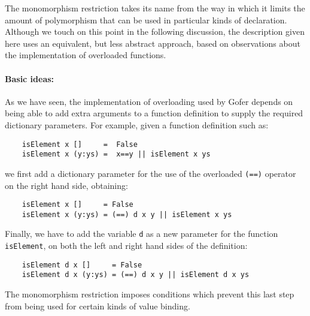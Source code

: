The monomorphism restriction takes its name from the way  in  which  it
limits the amount of polymorphism that can be used in particular  kinds
of declaration.  Although we touch  on  this  point  in  the  following
discussion, the description given here uses  an  equivalent,  but  less
abstract approach, based on observations about  the  implementation  of
overloaded functions.

\paragraph{Basic ideas:}
As we have seen,  the  implementation  of  overloading  used  by  Gofer
depends on being able to add extra arguments to a  function  definition
to supply the required dictionary parameters.   For  example,  given  a
function definition such as:
\begin{verbatim}
    isElement x []     =  False
    isElement x (y:ys) =  x==y || isElement x ys
\end{verbatim}
we first add a dictionary parameter for the use of the overloaded  \verb"(==)"
operator on the right hand side, obtaining:
\begin{verbatim}
    isElement x []     = False
    isElement x (y:ys) = (==) d x y || isElement x ys
\end{verbatim}
Finally, we have to add the variable \verb"d"  as  a  new  parameter  for  the
function \verb"isElement", on both the  left  and  right  hand  sides  of  the
definition:
\begin{verbatim}
    isElement d x []     = False
    isElement d x (y:ys) = (==) d x y || isElement d x ys
\end{verbatim}
The monomorphism restriction imposes conditions which prevent this last
step from being used for certain kinds  of  value  binding.

